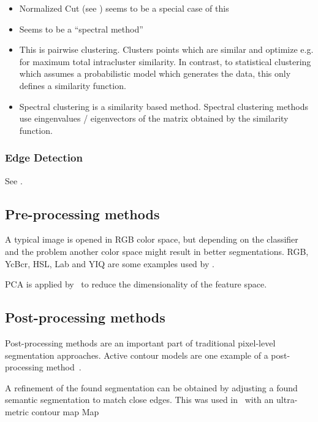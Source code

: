 \begin{itemize}
    \item Normalized Cut (see \cite{shi2000normalized}) seems to be a special
          case of this
    \item Seems to be a \enquote{spectral method}
    \item This is pairwise clustering. Clusters points which are similar and
          optimize e.g. for maximum total intracluster similarity. In contrast,
          to statistical clustering which assumes a probabilistic model which
          generates the data, this only defines a similarity function.
    \item Spectral clustering is a similarity based method. Spectral clustering
          methods use eingenvalues / eigenvectors of the matrix obtained by the
          similarity function.
\end{itemize}


\subsubsection{Edge Detection}

See \cite{kass1988snakes}.







\subsection{Pre-processing methods}\label{subsec:preprocessing-methods}%
A typical image is opened in RGB color space, but depending on the classifier
and the problem another color space might result in better segmentations. RGB,
YcBcr, HSL, Lab and YIQ are some examples used by \cite{cohen2015memory}.

\Gls{PCA} is applied by~\cite{chen2011pixel} to reduce the dimensionality of
the feature space.

\subsection{Post-processing methods}%
\label{subsec:post-processing-methods}%
Post-processing methods are an important part of traditional pixel-level
segmentation approaches. Active contour models are one example of a
post-processing method~\cite{kass1988snakes}.

A refinement of the found segmentation can be obtained by adjusting a found
semantic segmentation to match close edges. This was used
in~\cite{brox2011object} with an ultra-metric contour map
Map~\cite{arbelaez2009contours}


